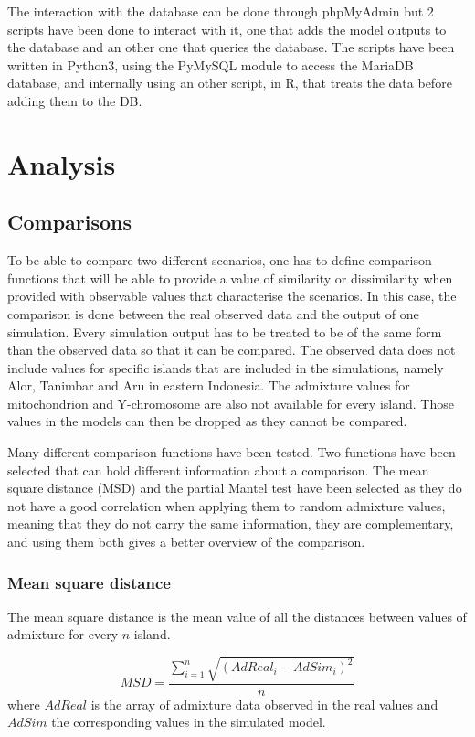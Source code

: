 \documentclass[a4paper,12pt]{report}
\begin{document}
The interaction with the database can be done through phpMyAdmin but 2 scripts have been done to interact with it, one that adds the model outputs to the database and an other one that queries the database. The scripts have been written in Python3, using the PyMySQL module to access the MariaDB database, and internally using an other script, in R, that treats the data before adding them to the DB.


\section{Analysis}


\subsection{Comparisons}
To be able to compare two different scenarios, one has to define comparison functions that will be able to provide a value of similarity or dissimilarity when provided with observable values that characterise the scenarios. In this case, the comparison is done between the real observed data and the output of one simulation.
Every simulation output has to be treated to be of the same form than the observed data so that it can be compared. The observed data does not include values for specific islands that are included in the simulations, namely Alor, Tanimbar and Aru in eastern Indonesia. The admixture values for mitochondrion and Y-chromosome are also not available for every island.
Those values in the models can then be dropped as they cannot be compared.

Many different comparison functions have been tested. Two functions have been selected that can hold different information about a comparison. The mean square distance (MSD) and the partial Mantel test have been selected as they do not have a good correlation when applying them to random admixture values, meaning that they do not carry the same information, they are complementary, and using them both gives a better overview of the comparison.

\subsubsection{Mean square distance}
The mean square distance is the mean value of all the distances between values of admixture for every $n$ island.

\begin{equation}
MSD = \frac{\sum\limits_{i=1}^{n} \sqrt{(AdReal_i - AdSim_i) ^ 2}}{n}
\end{equation}
where $AdReal$ is the array of admixture data observed in the real values and $AdSim$ the corresponding values in the simulated model.
\end{document}
